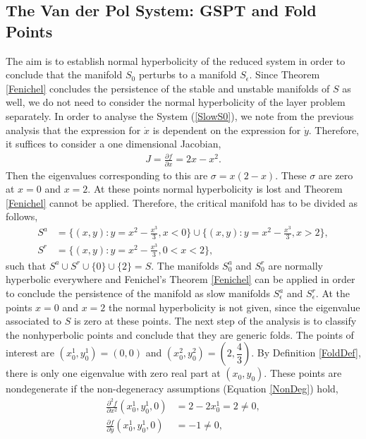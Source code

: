 \subsection{The Van der Pol System: GSPT and Fold Points}\label{VDPfolds}
The aim is to establish normal hyperbolicity of the reduced system in order to conclude that the manifold $S_0$ perturbs to a manifold $S_\epsilon$. Since Theorem \ref{Fenichel} concludes the persistence of the stable and unstable manifolds of $S$ as well, we do not need to consider the normal hyperbolicity of the layer problem separately. In order to analyse the System (\ref{SlowS0}), we note from the previous analysis that the expression for $\dot{x}$ is dependent on the expression for $\dot{y}$. Therefore, it suffices to consider a one dimensional Jacobian,
\begin{align*}
J= \frac{\partial f}{\partial x} = 2x - x^2.
\end{align*}
Then the eigenvalues corresponding to this are $\sigma = x(2-x)$. These $\sigma$ are zero at $x=0$ and $x=2$. At these points normal hyperbolicity is lost and Theorem \ref{Fenichel} cannot be applied. Therefore, the critical manifold has to be divided as follows,
\begin{align*}
S^a &=\bigg \lbrace (x,y): y = x^2-\frac{x^3}{3}, x< 0 \bigg \rbrace \cup \bigg \lbrace (x,y): y = x^2-\frac{x^3}{3}, x>2 \bigg\rbrace, \\
S^r &= \bigg\lbrace (x,y): y = x^2-\frac{x^3}{3}, 0< x< 2 \bigg\rbrace,
\end{align*}
such that $S^a \cup S^r \cup \{0\} \cup \{2\} = S$.
The manifolds $S^a_0$ and $S^r_0$ are normally hyperbolic everywhere and  Fenichel's Theorem \ref{Fenichel} can be applied in order to conclude the persistence of the manifold as slow manifolds $S^a_\epsilon$ and $S^r_\epsilon$. At the points $x=0$ and $x=2$ the normal hyperbolicity is not given, since the eigenvalue associated to $S$ is zero at these points. The next step of the analysis is to classify the nonhyperbolic points and conclude that they are generic folds. The points of interest are $(x_0^1,y_0^1)=(0,0)$ and $(x_0^2,y_0^2)=\left(2,\dfrac{4}{3}\right)$. By Definition \ref{FoldDef}, there is only one eigenvalue with zero real part at $(x_0,y_0)$. These points are nondegenerate if the non-degeneracy assumptions (Equation \ref{NonDeg}) hold,
\begin{align*}
\frac{ \partial ^2 f}{ \partial x^2} (x_0^1,y_0^1, 0) &= 2-2 x_0^1 = 2 \neq 0, \\
\frac{\partial f}{\partial y}(x_0^1,y_0^1, 0) &= -1 \neq 0,
\end{align*}
